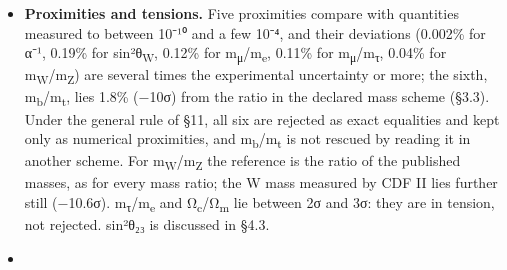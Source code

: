 \documentclass[11pt,a4paper]{article}
\begin{document}
\begin{itemize}
\tightlist
\item
  \textbf{Proximities and tensions.} Five proximities compare with quantities measured to between 10⁻¹⁰ and a few 10⁻⁴, and their deviations (0.002\% for α⁻¹, 0.19\% for sin²θ\textsubscript{W}, 0.12\% for m\textsubscript{μ}/m\textsubscript{e}, 0.11\% for m\textsubscript{μ}/m\textsubscript{τ}, 0.04\% for m\textsubscript{W}/m\textsubscript{Z}) are several times the experimental uncertainty or more; the sixth, m\textsubscript{b}/m\textsubscript{t}, lies 1.8\% (−10σ) from the ratio in the declared mass scheme (§3.3). Under the general rule of §11, all six are rejected as exact equalities and kept only as numerical proximities, and m\textsubscript{b}/m\textsubscript{t} is not rescued by reading it in another scheme. For m\textsubscript{W}/m\textsubscript{Z} the reference is the ratio of the published masses, as for every mass ratio; the W mass measured by CDF II \cite{57} lies further still (−10.6σ). m\textsubscript{τ}/m\textsubscript{e} and Ω\textsubscript{c}/Ω\textsubscript{m} lie between 2σ and 3σ: they are in tension, not rejected. sin²θ₂₃ is discussed in §4.3.
\item

\end{itemize}
\end{document}
